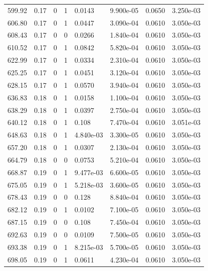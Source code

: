\documentclass[preview]{standalone}
\begin{document}
{{{{\begin{tabular}{L{1.2cm}C{1.2cm} C{0.3cm}C{0.5cm} C{1.4cm}C{1.4cm} C{1.4cm}C{1.4cm}}
  599.92  &  0.17  & 0     &  1 &  0.0143  & 9.900e-05  & 0.0650 &  3.250e-03   \\ 
  606.80  &  0.17  & 0     &  1 &  0.0447  & 3.090e-04  & 0.0610 &  3.050e-03   \\ 
  608.43  &  0.17  & 0     &  0 &  0.0266  & 1.840e-04  & 0.0610 &  3.050e-03   \\ 
  610.52  &  0.17  & 0     &  1 &  0.0842  & 5.820e-04  & 0.0610 &  3.050e-03   \\ 
  622.99  &  0.17  & 0     &  1 &  0.0334  & 2.310e-04  & 0.0610 &  3.050e-03   \\ 
  625.25  &  0.17  & 0     &  1 &  0.0451  & 3.120e-04  & 0.0610 &  3.050e-03   \\ 
  628.15  &  0.17  & 0     &  1 &  0.0570  & 3.940e-04  & 0.0610 &  3.050e-03   \\ 
  636.83  &  0.18  & 0     &  1 &  0.0158  & 1.100e-04  & 0.0610 &  3.050e-03   \\ 
  638.29  &  0.18  & 0     &  1 &  0.0397  & 2.750e-04  & 0.0610 &  3.050e-03   \\ 
  640.12  &  0.18  & 0     &  1 &  0.108  & 7.470e-04  & 0.0610 &  3.051e-03   \\ 
  648.63  &  0.18  & 0     &  1 &  4.840e-03  & 3.300e-05  & 0.0610 &  3.050e-03   \\ 
  657.20  &  0.18  & 0     &  1 &  0.0307  & 2.130e-04  & 0.0610 &  3.050e-03   \\ 
  664.79  &  0.18  & 0     &  0 &  0.0753  & 5.210e-04  & 0.0610 &  3.050e-03   \\ 
  668.87  &  0.19  & 0     &  1 &  9.477e-03  & 6.600e-05  & 0.0610 &  3.050e-03   \\ 
  675.05  &  0.19  & 0     &  1 &  5.218e-03  & 3.600e-05  & 0.0610 &  3.050e-03   \\ 
  678.43  &  0.19  & 0     &  0 &  0.128  & 8.840e-04  & 0.0610 &  3.050e-03   \\ 
  682.12  &  0.19  & 0     &  1 &  0.0102  & 7.100e-05  & 0.0610 &  3.050e-03   \\ 
  687.15  &  0.19  & 0     &  0 &  0.108  & 7.450e-04  & 0.0610 &  3.050e-03   \\ 
  692.63  &  0.19  & 0     &  0 &  0.0109  & 7.500e-05  & 0.0610 &  3.050e-03   \\ 
  693.38  &  0.19  & 0     &  1 &  8.215e-03  & 5.700e-05  & 0.0610 &  3.050e-03   \\ 
  698.05  &  0.19  & 0     &  1 &  0.0611  & 4.230e-04  & 0.0610 &  3.050e-03   \\ 

\end{tabular}}}}}
\end{document}

